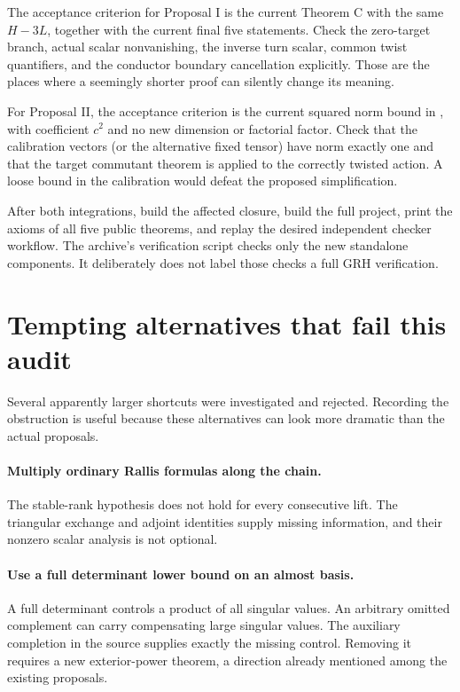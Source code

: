 The acceptance criterion for Proposal I is the current Theorem C with
the same \(H-3L\), together with the current final five statements.
Check the zero-target branch, actual scalar nonvanishing, the inverse
turn scalar, common twist quantifiers, and the conductor boundary
cancellation explicitly. Those are the places where a seemingly
shorter proof can silently change its meaning.

For Proposal II, the acceptance criterion is the current squared norm
bound in , with coefficient \(c^2\) and no new
dimension or factorial factor. Check that the calibration vectors
(or the alternative fixed tensor) have norm exactly one and that the
target commutant theorem is applied to the correctly twisted action.
A loose bound in the calibration would defeat the proposed simplification.

After both integrations, build the affected closure, build the full project,
print the axioms of all five public theorems, and replay the desired
independent checker workflow. The archive's verification script checks
only the new standalone components. It deliberately does not label
those checks a full GRH verification.

\section{Tempting alternatives that fail this audit}

Several apparently larger shortcuts were investigated and rejected.
Recording the obstruction is useful because these alternatives can look
more dramatic than the actual proposals.

\paragraph{Multiply ordinary Rallis formulas along the chain.}
The stable-rank hypothesis does not hold for every consecutive lift.
The triangular exchange and adjoint identities supply missing information,
and their nonzero scalar analysis is not optional.

\paragraph{Use a full determinant lower bound on an almost basis.}
A full determinant controls a product of all singular values.
An arbitrary omitted complement can carry compensating large singular
values. The auxiliary completion in the source supplies exactly the
missing control. Removing it requires a new exterior-power theorem,
a direction already mentioned among the existing proposals.

